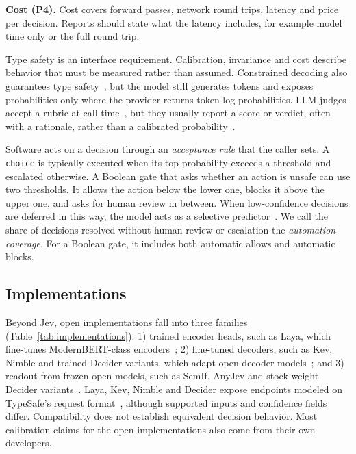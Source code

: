 \noindent\textbf{Cost (P4).} Cost covers forward passes, network round trips, latency and price per decision. Reports should state what the latency includes, for example model time only or the full round trip.

Type safety is an interface requirement. Calibration, invariance and cost describe behavior that must be measured rather than assumed. Constrained decoding also guarantees type safety~\cite{willard2023efficient}, but the model still generates tokens and exposes probabilities only where the provider returns token log-probabilities. LLM judges accept a rubric at call time~\cite{kim2024prometheus2,liu2023geval}, but they usually report a score or verdict, often with a rationale, rather than a calibrated probability~\cite{gu2024survey}.

Software acts on a decision through an \emph{acceptance rule} that the caller sets. A \texttt{choice} is typically executed when its top probability exceeds a threshold and escalated otherwise. A Boolean gate that asks whether an action is unsafe can use two thresholds. It allows the action below the lower one, blocks it above the upper one, and asks for human review in between. When low-confidence decisions are deferred in this way, the model acts as a selective predictor~\cite{geifman2017selective}. We call the share of decisions resolved without human review or escalation the \emph{automation coverage}. For a Boolean gate, it includes both automatic allows and automatic blocks.

\subsection{Implementations}
\label{sec:implementations}


Beyond Jev, open implementations fall into three families (Table~\ref{tab:implementations}): 1) trained encoder heads, such as Laya, which fine-tunes ModernBERT-class encoders~\cite{convai2026laya,warner2024smarter}; 2) fine-tuned decoders, such as Kev, Nimble and trained Decider variants, which adapt open decoder models~\cite{palmer2026kev,bespoke2026nimble,mapika2026decider}; and 3) readout from frozen open models, such as SemIf, AnyJev and stock-weight Decider variants~\cite{lee2026semif,nokia2026anyjev,mapika2026decider}. Laya, Kev, Nimble and Decider expose endpoints modeled on TypeSafe's request format~\cite{convai2026laya,palmer2026kev,bespoke2026nimble,mapika2026decider}, although supported inputs and confidence fields differ. Compatibility does not establish equivalent decision behavior. Most calibration claims for the open implementations also come from their own developers.
